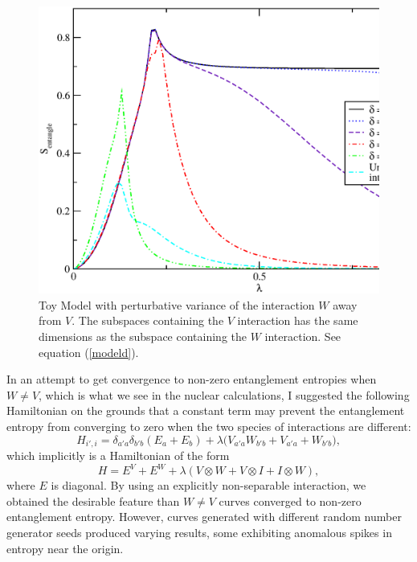 \begin{figure}
    \centering
    \includegraphics[width=	.75\textwidth,clip]{Figures/toymodel1delta}
    \caption{Toy Model with perturbative variance of the interaction $W$ away from $V$. 
    The subspaces containing the $V$ interaction has the same dimensions as the 
    subspace containing the $W$ interaction. See equation (\ref{modeld}).}
    \label{opt3}
\end{figure}

In an attempt to get convergence to non-zero entanglement entropies
when $W\neq V$, which is what we see in the nuclear calculations, I suggested 
the following Hamiltonian on the grounds that a constant term may 
prevent the entanglement entropy from converging to zero when the 
two species of interactions are different:
\begin{equation}
    H_{i',i} = \delta_{a'a}\delta_{b'b}(E_a+E_b)+\lambda
\big( V_{a'a} W_{b'b} + V_{a'a} + W_{b'b} \big ),
\end{equation}
which implicitly is a Hamiltonian of the form
\begin{equation}
    H = E^V + E^W + \lambda ( V\otimes W + V\otimes I + I \otimes W ),
\end{equation}
where $E$ is diagonal. By using an explicitly non-separable interaction,
we obtained the desirable feature than $W\neq V$ curves converged to
non-zero entanglement entropy. However, curves generated with different
random number generator seeds produced varying results, some exhibiting
anomalous spikes in entropy near the origin. 


